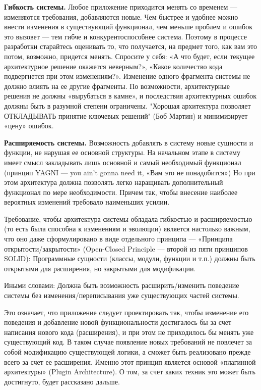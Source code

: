 \documentclass[a4paper]{article}
\begin{document}
\noindent\textbf{Гибкость системы.} Любое приложение приходится менять со временем — изменяются требования, добавляются новые. Чем быстрее и удобнее можно внести изменения в существующий функционал, чем меньше проблем и ошибок это вызовет — тем гибче и конкурентоспособнее система. Поэтому в процессе разработки старайтесь оценивать то, что получается, на предмет того, как вам это потом, возможно, придется менять. Спросите у себя: «А что будет, если текущее архитектурное решение окажется неверным?», «Какое количество кода подвергнется при этом изменениям?». Изменение одного фрагмента системы не должно влиять на ее другие фрагменты. По возможности, архитектурные решения не должны «вырубаться в камне», и последствия архитектурных ошибок должны быть в разумной степени ограничены. "Хорошая архитектура позволяет ОТКЛАДЫВАТЬ принятие ключевых решений" (Боб Мартин) и минимизирует «цену» ошибок.

\noindent\textbf{Расширяемость системы.} Возможность добавлять в систему новые сущности и функции, не нарушая ее основной структуры. На начальном этапе в систему имеет смысл закладывать лишь основной и самый необходимый функционал (принцип YAGNI — you ain’t gonna need it, «Вам это не понадобится») Но при этом архитектура должна позволять легко наращивать дополнительный функционал по мере необходимости. Причем так, чтобы внесение наиболее вероятных изменений требовало наименьших усилии.

Требование, чтобы архитектура системы обладала гибкостью и расширяемостью (то есть была способна к изменениям и эволюции) является настолько важным, что оно даже сформулировано в виде отдельного принципа — «Принципа открытости/закрытости» (Open-Closed Principle — второй из пяти принципов SOLID): Программные сущности (классы, модули, функции и т.п.) должны быть открытыми для расширения, но закрытыми для модификации.

Иными словами: Должна быть возможность расширить/изменить поведение системы без изменения/переписывания уже существующих частей системы.

Это означает, что приложение следует проектировать так, чтобы изменение его поведения и добавление новой функциональности достигалось бы за счет написания нового кода (расширения), и при этом не приходилось бы менять уже существующий код. В таком случае появление новых требований не повлечет за собой модификацию существующей логики, а сможет быть реализовано прежде всего за счет ее расширения. Именно этот принцип является основой «плагинной архитектуры» (Plugin Architecture). О том, за счет каких техник это может быть достигнуто, будет рассказано дальше.
\end{document}
